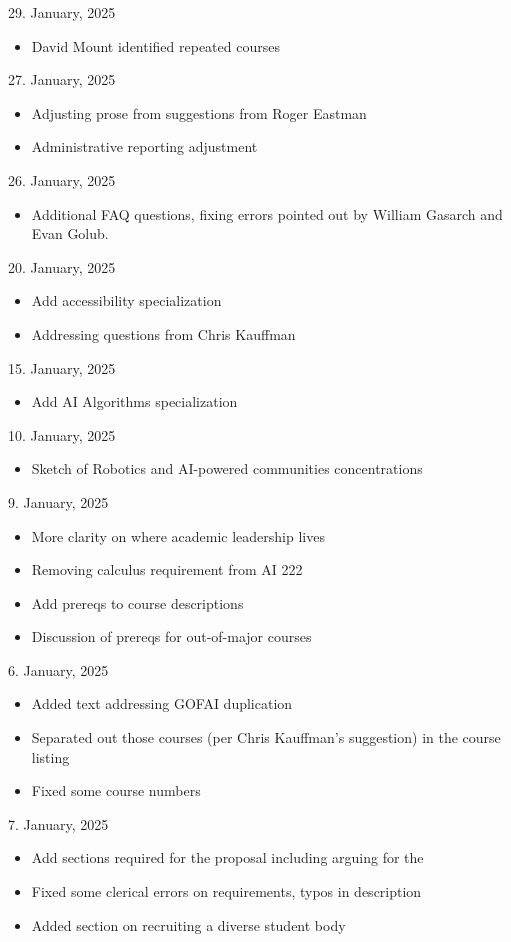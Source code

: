 29. January, 2025
\begin{itemize}
  \item David Mount identified repeated courses
\end{itemize}

27. January, 2025
\begin{itemize}
    \item Adjusting prose from suggestions from Roger Eastman
    \item Administrative reporting adjustment
\end{itemize}

26. January, 2025
\begin{itemize}
  \item Additional FAQ questions, fixing errors pointed out by William Gasarch and Evan Golub.
\end{itemize}

20. January, 2025
\begin{itemize}
 \item Add accessibility specialization
 \item Addressing questions from Chris Kauffman
\end{itemize}

15. January, 2025
\begin{itemize}
\item Add AI Algorithms specialization
\end{itemize}

10. January, 2025
\begin{itemize}
  \item Sketch of Robotics and AI-powered communities concentrations
\end{itemize}

9. January, 2025

\begin{itemize}
  \item More clarity on where academic leadership lives
  \item Removing calculus requirement from AI 222
  
  \item Add prereqs to course descriptions
  \item Discussion of prereqs for out-of-major courses
\end{itemize}

6. January, 2025

\begin{itemize}
    \item Added text addressing GOFAI duplication
    \item Separated out those courses (per Chris Kauffman's suggestion) in the course listing
    \item Fixed some course numbers
\end{itemize}

7. January, 2025

\begin{itemize}
    \item Add sections required for the  proposal including arguing for the 
    \item Fixed some clerical errors on requirements, typos in description
    \item Added section on recruiting a diverse student body
\end{itemize}

